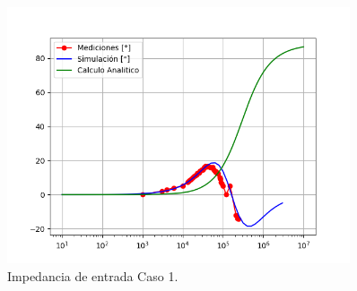 \begin{figure}[H]	
	\centering
	\includegraphics[width=0.9\textwidth]{Ejercicio1/Imagenes/ZinphC1.png}
	\caption{Impedancia de entrada Caso 1.}
	\label{fig:CompZinphC1}
\end{figure} 

